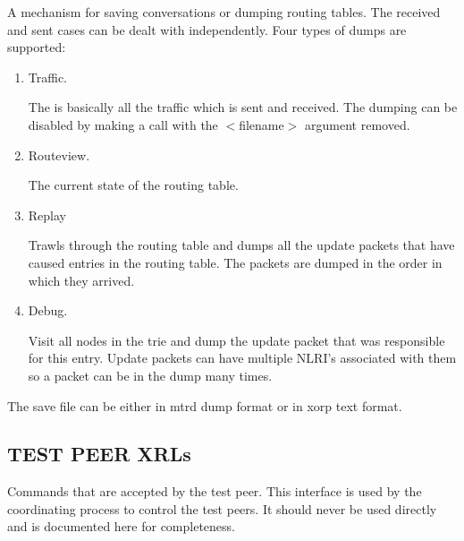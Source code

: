 \documentclass[11pt]{article}
\begin{document}
\begin{itemize}
  A mechanism for saving conversations or dumping routing tables. The
  received and sent cases can be dealt with independently. Four types
  of dumps are supported:

  \begin{enumerate}

    \item Traffic.

    The is basically all the traffic which is sent and
    received. The dumping can be disabled by making a call with
    the $<$filename$>$ argument removed.

    \item Routeview.

    The current state of the routing table.

    \item Replay

    Trawls through the routing table and dumps all the update
    packets that have caused entries in the routing table. The
    packets are dumped in the order in which they arrived.

    \item Debug.

    Visit all nodes in the trie and dump the update packet that
    was responsible for this entry. Update packets can have
    multiple NLRI's associated with them so a packet can be in the
    dump many times.

  \end{enumerate}

  The save file can be either in mtrd dump format or in xorp text format.

\end{itemize}

\subsection{TEST PEER XRLs}

Commands that are accepted by the test peer. This interface is
used by the coordinating process to control the test peers. It should
never be used directly and is documented here for completeness.
\end{document}
